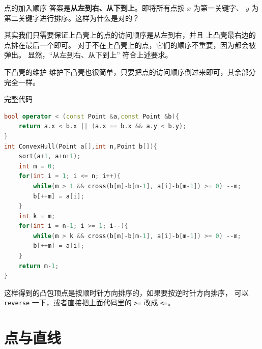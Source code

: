 \documentclass{beamer}
\begin{document}
\begin{frame}[fragile]{点的加入顺序}
    \small
    答案是\textbf{从左到右、从下到上}。即将所有点按 $x$ 为第一关键字、
    $y$ 为第二关键字进行排序。这样为什么是对的？
    \vspace{1em}\pause

    其实我们只需要保证上凸壳上的点的访问顺序是从左到右，并且
    上凸壳最右边的点排在最后一个即可。
    对于不在上凸壳上的点，它们的顺序不重要，因为都会被弹出。
    显然，“从左到右、从下到上” 符合上述要求。
\end{frame}

\begin{frame}[fragile]{下凸壳的维护}
    \small
    维护下凸壳也很简单，只要把点的访问顺序倒过来即可，其余部分完全一样。
\end{frame}

\begin{frame}[fragile]{完整代码}
    \small
    \begin{lstlisting}[language=c++]
bool operator < (const Point &a,const Point &b){
    return a.x < b.x || (a.x == b.x && a.y < b.y);
}
int ConvexHull(Point a[],int n,Point b[]){
    sort(a+1, a+n+1);
    int m = 0;
    for(int i = 1; i <= n; i++){
        while(m > 1 && cross(b[m]-b[m-1], a[i]-b[m-1]) >= 0) --m;
        b[++m] = a[i];
    }
    int k = m;
    for(int i = n-1; i >= 1; i--){
        while(m > k && cross(b[m]-b[m-1], a[i]-b[m-1]) >= 0) --m;
        b[++m] = a[i];
    }
    return m-1;
}
    \end{lstlisting}

    \vspace{1em}\pause
    这样得到的凸包顶点是按顺时针方向排序的，如果要按逆时针方向排序，
    可以 \verb|reverse| 一下，或者直接把上面代码里的 \verb|>=| 改成 \verb|<=|。
\end{frame}

\section{点与直线}
\end{document}
